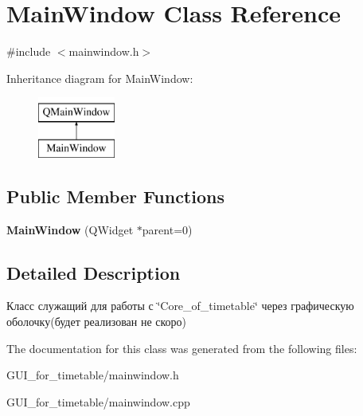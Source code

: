 \hypertarget{class_main_window}{}\section{Main\+Window Class Reference}
\label{class_main_window}


{\ttfamily \#include $<$mainwindow.\+h$>$}

Inheritance diagram for Main\+Window\+:\begin{figure}[H]
\begin{center}
\leavevmode
\includegraphics[height=2.000000cm]{class_main_window}
\end{center}
\end{figure}
\subsection*{Public Member Functions}
\begin{DoxyCompactItemize}
\item 
{\bfseries Main\+Window} (Q\+Widget $\ast$parent=0)\hypertarget{class_main_window_a8b244be8b7b7db1b08de2a2acb9409db}{}\label{class_main_window_a8b244be8b7b7db1b08de2a2acb9409db}

\end{DoxyCompactItemize}


\subsection{Detailed Description}
Класс служащий для работы с \char`\"{}\+Core\+\_\+of\+\_\+timetable\char`\"{} через графическую оболочку(будет реализован не скоро) 

The documentation for this class was generated from the following files\+:\begin{DoxyCompactItemize}
\item 
G\+U\+I\+\_\+for\+\_\+timetable/mainwindow.\+h\item 
G\+U\+I\+\_\+for\+\_\+timetable/mainwindow.\+cpp\end{DoxyCompactItemize}
